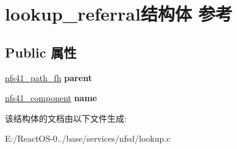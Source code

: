 \hypertarget{structlookup__referral}{}\section{lookup\+\_\+referral结构体 参考}
\label{structlookup__referral}
\subsection*{Public 属性}
\begin{DoxyCompactItemize}
\item 
\mbox{\label{structlookup__referral_ac6463165c3ae376be2b476bd961a02eb}} 
\hyperlink{struct____nfs41__path__fh}{nfs41\+\_\+path\+\_\+fh} {\bfseries parent}
\item 
\mbox{\label{structlookup__referral_a5b8e0b8865b54a2eae55ec9aafe31e12}} 
\hyperlink{struct____nfs41__component}{nfs41\+\_\+component} {\bfseries name}
\end{DoxyCompactItemize}


该结构体的文档由以下文件生成\+:\begin{DoxyCompactItemize}
\item 
E\+:/\+React\+O\+S-\/0../base/services/nfsd/lookup.\+c\end{DoxyCompactItemize}

